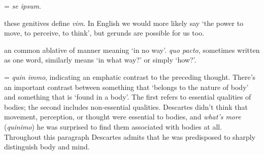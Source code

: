  = \textit{se ipsum}.

 these genitives define \textit{vim}. In English we would more likely say `the power to move, to perceive, to think', but gerunds are possible for us too.

 an common ablative of manner meaning `in no way'. \textit{quo pacto}, sometimes written as one word, similarly means `in what way?' or simply `how?'.

 = \textit{quin immo}, indicating an emphatic contrast to the preceding thought. There's an important contrast between something that `belongs to the nature of body' and something that is `found in a body'. The first refers to essential qualities of bodies; the second includes non-essential qualities. Descartes didn't think that movement, perception, or thought were essential to bodies, and \textit{what's more} (\textit{quinimo}) he was surprised to find them associated with bodies at all. Throughout this paragraph Descartes admits that he was predisposed to sharply distinguish body and mind.

